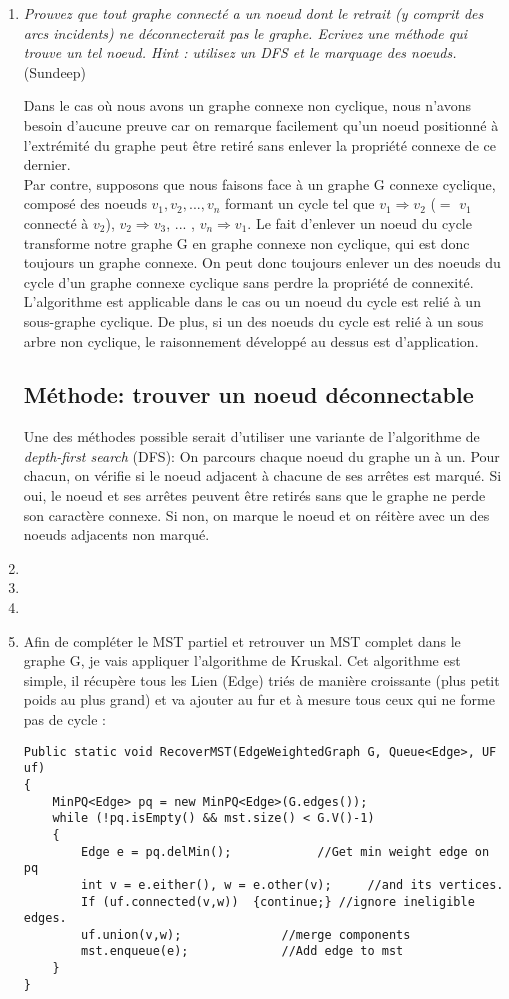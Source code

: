 \documentclass[11pt]{article}
\begin{document}
\begin{enumerate}
\item \textit{Prouvez que tout graphe connecté a un noeud dont le retrait (y comprit des arcs incidents) ne déconnecterait pas le graphe. Ecrivez une méthode qui trouve un
tel noeud. Hint : utilisez un DFS et le marquage des noeuds.} (Sundeep) \medskip

Dans le cas où nous avons un graphe connexe non cyclique, nous n'avons besoin d'aucune preuve car on remarque facilement qu'un noeud positionné à l'extrémité du graphe peut être retiré sans enlever la propriété connexe de ce dernier.\\
Par contre, supposons que nous faisons face à un graphe G connexe cyclique, composé des noeuds $v_1, v_2, ..., v_n$ formant un cycle tel que $v_1 \Rightarrow v_2$ ($=$ $v_1$ connecté à $v_2$), $v_2 \Rightarrow v_3$, ... , $v_n \Rightarrow v_1$. Le fait d'enlever un noeud du cycle transforme notre graphe G en graphe connexe non cyclique, qui est donc toujours un graphe connexe. On peut donc toujours enlever un des noeuds du cycle d'un graphe connexe cyclique sans perdre la propriété de connexité. L'algorithme est applicable dans le cas ou un noeud du cycle est relié à un sous-graphe cyclique. De plus, si un des noeuds du cycle est relié à un sous arbre non cyclique, le raisonnement développé au dessus est d'application. 
\subsection*{Méthode: trouver un noeud déconnectable}
Une des méthodes possible serait d'utiliser une variante de l'algorithme de \textit{depth-first search} (DFS): On parcours chaque noeud du graphe un à un. Pour chacun, on vérifie si le noeud adjacent à chacune de ses arrêtes est marqué. Si oui, le noeud et ses arrêtes peuvent être retirés sans que le graphe ne perde son caractère connexe. Si non, on marque le noeud et on réitère avec un des noeuds adjacents non marqué.






\item 

\item 

\item 

\item Afin de compléter le MST partiel et retrouver un MST complet dans le graphe G, je vais appliquer l’algorithme de Kruskal. Cet algorithme est simple, il récupère tous les Lien (Edge) triés de manière croissante (plus petit poids au plus grand) et va ajouter au fur et à mesure tous ceux qui ne forme pas de cycle :
\\
\begin{lstlisting}
Public static void RecoverMST(EdgeWeightedGraph G, Queue<Edge>, UF uf)
{
	MinPQ<Edge> pq = new MinPQ<Edge>(G.edges());
	while (!pq.isEmpty() && mst.size() < G.V()-1)
	{
		Edge e = pq.delMin();   		 //Get min weight edge on pq
		int v = e.either(), w = e.other(v); 	//and its vertices.
		If (uf.connected(v,w))  {continue;}	//ignore ineligible edges.
		uf.union(v,w); 				//merge components 
		mst.enqueue(e);				//Add edge to mst
	}
}
\end{lstlisting} 


\end{enumerate}
\end{document}
